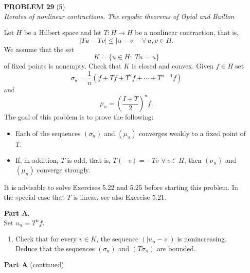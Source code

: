 \documentclass[12pt]{article}
\newcommand{\abs}[1]{\left|#1\right|}
\begin{document}
\bigskip
 
\noindent\textbf{PROBLEM 29} (5)\\[4pt]
\textit{Iterates of nonlinear contractions. The ergodic theorems of Opial and Baillon}
 
\medskip
 
Let $H$ be a Hilbert space and let $T : H \to H$ be a nonlinear contraction, that is,
\[
\abs{Tu - Tv} \le \abs{u - v} \quad \forall\, u, v \in H.
\]
We assume that the set
\[
K = \{u \in H;\; Tu = u\}
\]
of fixed points is nonempty. Check that $K$ is closed and convex. Given $f \in H$ set
\[
\sigma_n = \frac{1}{n}(f + Tf + T^2 f + \cdots + T^{n-1}f)
\]
and
\[
\mu_n = \left(\frac{I+T}{2}\right)^n f.
\]
The goal of this problem is to prove the following:
\begin{itemize}
\item[(A)] Each of the sequences $(\sigma_n)$ and $(\mu_n)$ converges weakly to a fixed point of $T$.
\item[(B)] If, in addition, $T$ is odd, that is, $T(-v) = -Tv$ $\forall\, v \in H$, then $(\sigma_n)$ and $(\mu_n)$
converge strongly.
\end{itemize}
 
\noindent It is advisable to solve Exercises 5.22 and 5.25 before starting this problem. In
the special case that $T$ is linear, see also Exercise 5.21.
 
\medskip
 
\noindent\textbf{Part A.}\\
Set $u_n = T^n f$.
 
\begin{enumerate}
\item Check that for every $v \in K$, the sequence $(\abs{u_n - v})$ is nonincreasing.
Deduce that the sequences $(\sigma_n)$ and $(T\sigma_n)$ are bounded.
\end{enumerate}

\medskip
 
\noindent\textbf{Part A} (continued)
 
\end{document}
